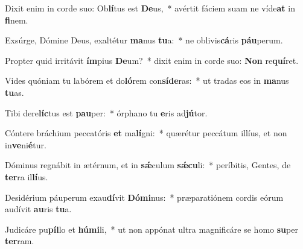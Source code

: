 \item Dixit enim in corde suo: Ob\textbf{lí}tus est \textbf{De}us,~* avértit fáciem suam ne víde\textbf{at} in \textbf{fi}nem.
\item Exsúrge, Dómine Deus, exaltétur \textbf{ma}nus \textbf{tu}a:~* ne oblivis\textbf{cá}ris \textbf{páu}perum.
\item Propter quid irritávit \textbf{ím}pius \textbf{De}um?~* dixit enim in corde suo: \textbf{Non} re\textbf{quí}ret.
\item Vides quóniam tu labórem et do\textbf{ló}rem con\textbf{sí}\textbf{de}ras:~* ut tradas eos in \textbf{ma}nus \textbf{tu}as.
\item Tibi dere\textbf{líc}tus est \textbf{pau}per:~* órphano tu \textbf{e}ris ad\textbf{jú}tor.
\item Cóntere bráchium peccatóris \textbf{et} ma\textbf{lí}gni:~* quærétur peccátum illíus, et non in\textbf{ve}ni\textbf{é}tur.
\item Dóminus regnábit in ætérnum, et in \textbf{sǽ}culum \textbf{sǽ}\textbf{cu}li:~* períbitis, Gentes, de \textbf{ter}ra il\textbf{lí}us.
\item Desidérium páuperum exau\textbf{dí}vit \textbf{Dó}\textbf{mi}nus:~* præparatiónem cordis eórum audívit \textbf{au}ris \textbf{tu}a.
\item Judicáre pu\textbf{píl}lo et \textbf{hú}\textbf{mi}li,~* ut non appónat ultra magnificáre se homo \textbf{su}per \textbf{ter}ram.
